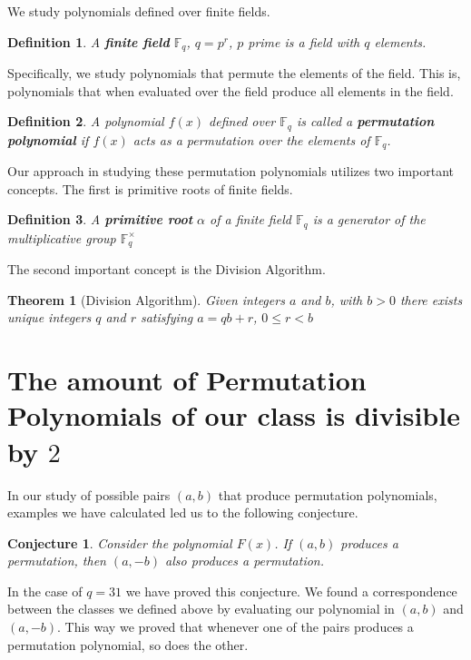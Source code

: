 \documentclass[12pt]{article}
\newtheorem{conjecture}{Conjecture}
\newtheorem{definition}{Definition}
\newtheorem{theorem}{Theorem}
\begin{document}
We study polynomials defined over finite fields.

\begin{definition}
	A \textbf{finite field} $\mathbb{F}_{q}$, $q=p^{r}$, $p$ prime is a field with $q$ elements.
\end{definition}

Specifically, we study polynomials that permute the elements of the field. This is, polynomials that when evaluated over the field produce all elements in the field.
\begin{definition}
	A polynomial $f(x)$ defined over $\mathbb{F}_{q}$ is called a \textbf{permutation polynomial} if $f(x)$ acts as a permutation over the elements of $\mathbb{F}_{q}$.
\end{definition}

Our approach in studying these permutation polynomials utilizes two important concepts. The first is primitive roots of finite fields.
\begin{definition}
	A \textbf{primitive root} $\alpha$ of a finite field $\mathbb{F}_{q}$ is a generator of the multiplicative group $\mathbb{F}_{q}^{\times}$
\end{definition}

The second important concept is the Division Algorithm.
\begin{theorem}[Division Algorithm]
	Given integers $a$ and $b$, with $b>0$ there exists unique integers $q$ and $r$ satisfying $a=qb+r$, $0 \leq r < b$
\end{theorem}

\section{The amount of Permutation Polynomials of our class is divisible by $2$}\label{divby2}


In our study of possible pairs $(a,b)$ that produce permutation polynomials, examples we have calculated led us to the following conjecture.
\begin{conjecture}
	Consider the polynomial $F(x)$. If $(a,b)$ produces a permutation, then $(a,-b)$ also produces a permutation.
\end{conjecture}

In the case of $q=31$ we have proved this conjecture. We found a correspondence between the classes we defined above by evaluating our polynomial in $(a,b)$ and $(a,-b)$. This way we proved that whenever one of the pairs produces a permutation polynomial, so does the other.
\end{document}

